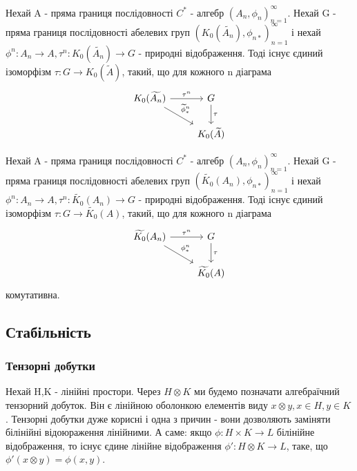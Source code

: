 \begin{lemma}
    Нехай A - пряма границя послідовності $C^*$ - алгебр $(A_n, \phi_n)_{n=1}^{\infty}$.
    Нехай G - пряма границя послідовності абелевих груп $(K_0(\widetilde{A_n}), \phi_{n*})_{n=1}^{\infty}$
    і нехай $\phi^n: A_n \to A, \tau^n: K_0(\widetilde{A_n}) \to G$ - природні відображення.
    Тоді існує єдиний ізоморфізм $\tau: G \to K_0(\widetilde{A})$, такий, що для кожного n діаграма
    \begin{equation*}
        \begin{tikzcd}
            K_0(\widetilde{A_n}) \arrow[rd, "\widetilde{\phi}^n_*"] \arrow[r, "\tau^n"] & G \arrow[d, "\tau"] \\
            & K_0(\widetilde{A})
        \end{tikzcd}
    \end{equation*}
\end{lemma}

\begin{theorem}
    Нехай A - пряма границя послідовності $C^*$ - алгебр $(A_n, \phi_n)_{n=1}^{\infty}$.
    Нехай G - пряма границя послідовності абелевих груп $(\widetilde{K_0}(A_n), \phi_{n*})_{n=1}^{\infty}$
    і нехай $\phi^n: A_n \to A, \tau^n: \widetilde{K_0}(A_n) \to G$ - природні відображення.
    Тоді існує єдиний ізоморфізм $\tau: G \to \widetilde{K_0}(A)$, такий, що для кожного n діаграма
    \begin{equation*}
        \begin{tikzcd}
            \widetilde{K_0}(A_n) \arrow[rd, "\phi^n_*"] \arrow[r, "\tau^n"] & G \arrow[d, "\tau"] \\
            & \widetilde{K_0}(A)
        \end{tikzcd}
    \end{equation*}
    комутативна.
\end{theorem}

\subsection{Стабільність}\label{subsec:стабільність}

\subsubsection{Тензорні добутки}
Нехай H,K - лінійні простори.
Через $H \otimes K$ ми будемо позначати алгебраїчний тензорний добуток.
Він є лінійною оболонкою елементів виду $x \otimes y, x \in H, y \in K$.
Тензорні добутки дуже корисні і одна з причин - вони дозволяють заміняти білінійні відоюраження лінійними.
А саме: якщо $\phi: H \times K \to L$ білінійне відображення, то існує єдине лінійне відображення $\phi': H \otimes K \to L$,
таке, що $\phi'(x \otimes y) = \phi(x,y)$.

